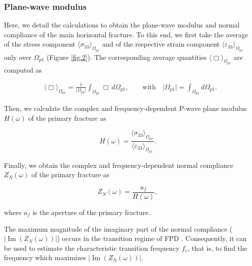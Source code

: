\documentclass[draft]{agujournal2019}
\renewcommand{\Im}{\operatorname{Im} }
\begin{document}
\subsubsection{Plane-wave modulus}

Here, we detail the calculations to obtain the plane-wave modulus and normal compliance of the main horizontal fracture.  To this end, we first take the average of the stress component $\langle \sigma_{33} \rangle_{\Omega_{p1}}$ and of the respective strain component $\langle \varepsilon_{33} \rangle_{\Omega_{p1}}$ only over $\Omega_{p1}$ (Figure \ref{fig.2}). The corresponding average quantities $\langle \Box \rangle_{\Omega_{p1}}$ are computed as
\begin{linenomath*}
\begin{equation}\label{Eq.10}
\begin{split}
&\langle \Box \rangle_{\Omega_{p1}} = \frac{1}{\vert \Omega_{p1} \vert} \int_{\Omega_{p1}} \Box \, d\Omega_{p1}, \qquad \text{with} \quad  \vert \Omega_{p1} \vert = \int_{\Omega_{p1}}  d\Omega_{p1}.
\end{split}
\end{equation}
\end{linenomath*}

Then, we calculate the complex and frequency-dependent P-wave plane modulus $H(\omega)$ of the primary fracture as
\begin{linenomath*}
\begin{equation}\label{Eq.11}
H(\omega)= \frac{\langle \sigma_{33} \rangle_{\Omega_{p1}}}{\langle \varepsilon_{33} \rangle_{\Omega_{p1}}}.
\end{equation}
\end{linenomath*} 

Finally, we obtain the complex and frequency-dependent normal compliance $Z_N (\omega) $ of the primary fracture as
\begin{linenomath*}
\begin{equation}\label{Eq.12}
Z_N(\omega)= \frac{a_f}{H(\omega)}, 
\end{equation}
\end{linenomath*} 
where $a_f$ is the aperture of the primary fracture. 

The maximum magnitude of the imaginary part of the normal compliance ($ |\Im(Z_N (\omega))|$)  occurs in the transition regime of FPD \cite{Rubino2015a}. Consequently, it can be used to estimate the characteristic transition frequency $f_c$, that is, to find the frequency which maximizes $ |\Im(Z_N (\omega))|$.
\end{document}
